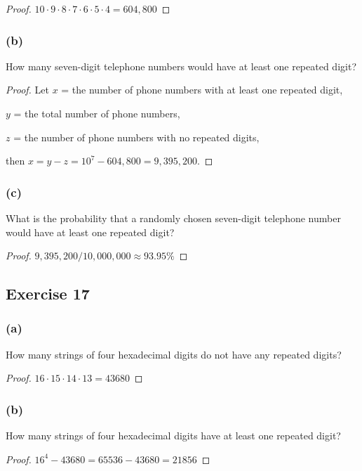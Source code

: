 \documentclass[14pt]{extarticle}
\begin{document}
\begin{proof}
\(10 \cdot 9 \cdot 8 \cdot 7 \cdot 6 \cdot 5 \cdot 4 = 604,800\)
\end{proof}

\subsubsection{(b)}
How many seven-digit telephone numbers would have at least one repeated digit?

\begin{proof}
Let $x$ = the number of phone numbers with at least one repeated digit,

$y$ = the total number of phone numbers,

$z$ = the number of phone numbers with no repeated digits,

then \(x = y - z = 10^7 - 604,800 = 9,395,200\).
\end{proof}

\subsubsection{(c)}
What is the probability that a randomly chosen seven-digit telephone number would have at least one repeated digit?

\begin{proof}
\(9,395,200 / 10,000,000 \approx 93.95\%\)
\end{proof}

\subsection{Exercise 17}
\subsubsection{(a)}
How many strings of four hexadecimal digits do not have any repeated digits?

\begin{proof}
\(16 \cdot 15 \cdot 14 \cdot 13 = 43680\)
\end{proof}

\subsubsection{(b)}
How many strings of four hexadecimal digits have at least one repeated digit?

\begin{proof}
\(16^4 - 43680 = 65536 - 43680 = 21856\)
\end{proof}
\end{document}
